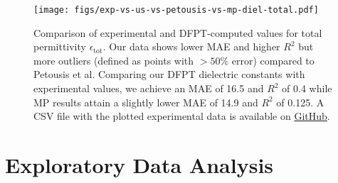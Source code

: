 \documentclass{article}
\newcommand{\epstot}{\epsilon_\text{tot}}
\begin{document}
\begin{figure}[htbp!]
    \centering
    \texttt{[image: figs/exp-vs-us-vs-petousis-vs-mp-diel-total.pdf]}
    \caption{
        Comparison of experimental and DFPT-computed values for total permittivity $\epstot$.
        Our data shows lower MAE and higher $R^2$ but more outliers (defined as points with $>50\%$ error) compared to Petousis et al.
        Comparing our DFPT dielectric constants with experimental values, we achieve an MAE of 16.5 and $R^2$ of 0.4 while MP results attain a slightly lower MAE of 14.9 and $R^2$ of 0.125.
        A CSV file with the plotted experimental data is available on \href{https://github.com/janosh/dielectrics/blob/68839f9d8/data/others/petousis/exp-petousis.csv}{GitHub}.
    }
    \label{fig:exp-vs-us-vs-petousis-diel-total}
\end{figure}

\clearpage

\section{Exploratory Data Analysis}
\label{sec:exploratory-data-analysis}
\end{document}

